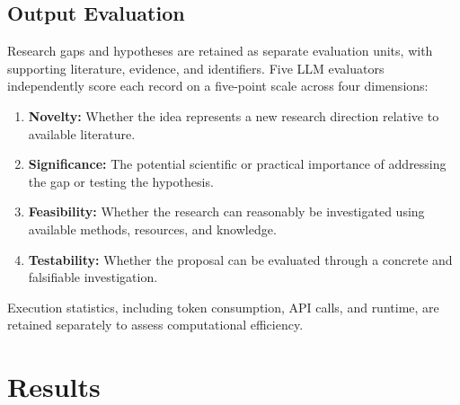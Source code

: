 \documentclass[sigconf,review,anonymous=false]{acmart}
\begin{document}
\subsection{Output Evaluation}
Research gaps and hypotheses are retained as separate evaluation units, with supporting literature, evidence, and identifiers. Five LLM evaluators independently score each record on a five-point scale across four dimensions:
\begin{enumerate}[leftmargin=*]
  \item \textbf{Novelty:} Whether the idea represents a new research direction relative to available literature.
  \item \textbf{Significance:} The potential scientific or practical importance of addressing the gap or testing the hypothesis.
  \item \textbf{Feasibility:} Whether the research can reasonably be investigated using available methods, resources, and knowledge.
  \item \textbf{Testability:} Whether the proposal can be evaluated through a concrete and falsifiable investigation.
\end{enumerate}
Execution statistics, including token consumption, API calls, and runtime, are retained separately to assess computational efficiency.

\section{Results}
\end{document}
